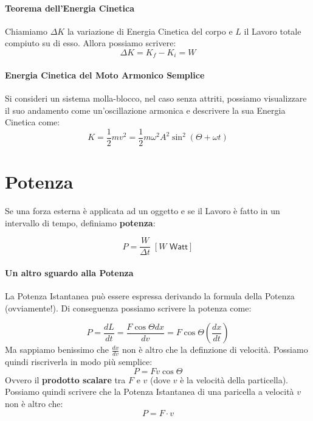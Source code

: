         \paragraph{Teorema dell'Energia Cinetica} Chiamiamo $\Delta K$ la 
        variazione di Energia Cinetica del corpo e $L$ il Lavoro totale 
        compiuto su di esso. Allora possiamo scrivere:
        \begin{equation}
            \Delta K = K_f - K_i = W
        \end{equation}

        \paragraph{Energia Cinetica del Moto Armonico Semplice} Si consideri un
        sistema molla-blocco, nel caso senza attriti, possiamo visualizzare il 
        suo andamento come un'oscillazione armonica e descrivere la sua Energia
        Cinetica come:
        \begin{equation}
            K = \frac{1}{2}mv^2 = \frac{1}{2}m\omega^2A^2\sin^2
            (\Theta + \omega t)
        \end{equation}

    
    \section{Potenza} Se una forza esterna è applicata ad un oggetto e se il 
    Lavoro è fatto in un intervallo di tempo, definiamo \textbf{potenza}:
        
        \begin{equation}
            P = \frac{W}{\Delta t} \; [W \textsf{  Watt}]
        \end{equation}

        \paragraph{Un altro sguardo alla Potenza} La Potenza Istantanea può 
        essere espressa derivando la formula della Potenza (ovviamente!). Di 
        conseguenza possiamo scrivere la potenza come:

        \begin{equation*}
            P = \frac{dL}{dt} = \frac{F \cos \Theta dx}{dv} 
            = F \cos \Theta (\frac{dx}{dt})
        \end{equation*}
        Ma sappiamo benissimo che $\frac{dx}{dv}$ non è altro che la definzione 
        di velocità. Possiamo quindi riscriverla in modo più semplice:
        \begin{equation*}
            P = Fv\cos\Theta
        \end{equation*}
        Ovvero il \textbf{prodotto scalare} tra $F$ e $v$ (dove $v$ è la 
        velocità della particella). Possiamo quindi scrivere che la Potenza 
        Istantanea di una paricella a velocità $v$ non è altro che:
        \begin{equation}
            P = F \cdot v
        \end{equation}


